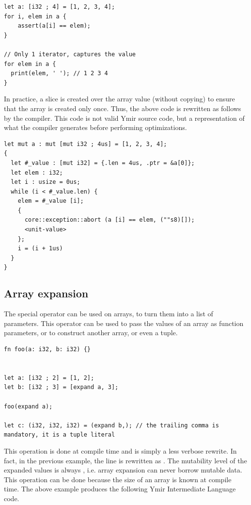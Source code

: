 \begin{lstlisting}[style=coloredverbatim]
let a: [i32 ; 4] = [1, 2, 3, 4];
for i, elem in a {
    assert(a[i] == elem);
}

// Only 1 iterator, captures the value
for elem in a {
  print(elem, ' '); // 1 2 3 4
}
\end{lstlisting}

In practice, a slice is created over the array value (without copying) to ensure
that the array is created only once. Thus, the above code is rewritten as
follows by the compiler. This code is not valid Ymir source code, but a
representation of what the compiler generates before performing optimizations.

\begin{lstlisting}[style=myilVerb]
let mut a : mut [mut i32 ; 4us] = [1, 2, 3, 4];
{
  let #_value : [mut i32] = {.len = 4us, .ptr = &a[0]};
  let elem : i32;
  let i : usize = 0us;
  while (i < #_value.len) {
    elem = #_value [i];
    {
      core::exception::abort (a [i] == elem, (""s8)[]);
      <unit-value>
    };
    i = (i + 1us)
  }
}
\end{lstlisting}


\subsection {Array expansion}

The special operator  can be used on arrays, to turn them into a
list of parameters. This operator can be used to pass the values of an array as
function parameters, or to construct another array, or even a tuple.

\begin{lstlisting}[style=coloredverbatim]
fn foo(a: i32, b: i32) {}


let a: [i32 ; 2] = [1, 2];
let b: [i32 ; 3] = [expand a, 3];

foo(expand a);

let c: (i32, i32, i32) = (expand b,); // the trailing comma is mandatory, it is a tuple literal
\end{lstlisting}

This operation is done at compile time and is simply a less verbose rewrite. In
fact, in the previous example, the line  is rewritten as
. The mutability level of the expanded values is
always , i.e. array expansion can never borrow mutable data. This
operation can be done because the size of an array is known at compile time. The
above example produces the following Ymir Intermediate Language code.

